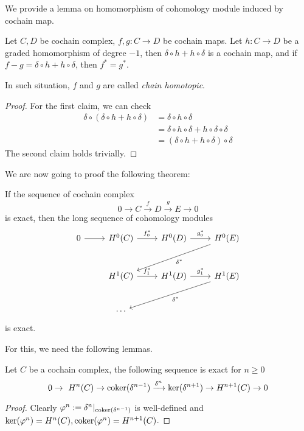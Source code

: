 We provide a lemma on homomorphism of cohomology module induced by cochain map.

\begin{lem}
    Let $C,D$ be cochain complex, $f,g:C\to D$ be cochain maps.
    Let $h:C\to D$ be a graded homomorphism of degree $-1$, then $\delta\circ h+h\circ\delta$ is a cochain map, and if $f-g=\delta\circ h+h\circ\delta$, then $f^*=g^*$.
\end{lem}

In such situation, $f$ and $g$ are called \emph{chain homotopic}.
\begin{proof}
    For the first claim, we can check
    \begin{align*}
        \delta\circ(\delta\circ h+h\circ\delta)&=\delta\circ h\circ\delta\\
        &=\delta\circ h\circ\delta+h\circ\delta\circ\delta\\
        &=(\delta\circ h+h\circ\delta)\circ\delta
    \end{align*}
    The second claim holds trivially.
\end{proof}

We are now going to proof the following theorem:
\begin{thm}\label{zigzag}
    If the sequence of cochain complex
    \[0\to C\xrightarrow{f} D\xrightarrow{g} E\to 0\]
    is exact, then the long sequence of cohomology modules
    \[\begin{tikzcd}
        0 \ar[r] & H^0(C) \ar[r, "f_0^*"] & H^0(D) \ar[r, "g_0^*"] & H^0(E) \ar[dll, "\delta^*"] \\[3mm]
        {} & H^1(C) \ar[r, "f_1^*"] & H^1(D) \ar[r, "g_1^*"] & H^1(E) \ar[dll, "\delta^*"] \\[3mm]
        {} & \cdots & {} & {}
    \end{tikzcd}\]
    is exact.
\end{thm}

For this, we need the following lemmas.

\begin{lem}\label{coho short exact}
    Let $C$ be a cochain complex, the following sequence is exact for $n\geq 0$
    \[0\to\ H^n(C)\to\coker(\delta^{n-1})\xrightarrow{\delta^n}\ker(\delta^{n+1})\to H^{n+1}(C)\to 0\]
\end{lem}
\begin{proof}
    Clearly $\varphi^n:=\delta^n|_{\operatorname{coker}(\delta^{n-1})}$ is well-defined and $\ker(\varphi^n)=H^n(C),\operatorname{coker}(\varphi^n)=H^{n+1}(C)$.
\end{proof}

